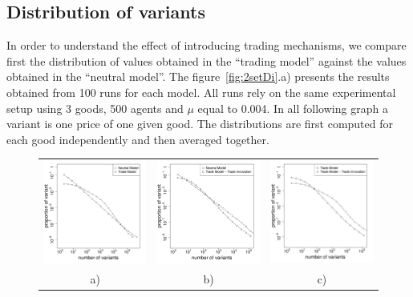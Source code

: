 \documentclass{wscpaperproc}
\begin{document}
\subsection{Distribution of variants}

In order to understand the effect of introducing trading mechanisms, we compare first the distribution of values obtained in the ``trading model'' against the values obtained in the ``neutral model''. The figure~\ref{fig:2setDi}.a) presents the results obtained from 100 runs for each model. All runs rely on the same experimental setup using 3 goods, 500 agents and $\mu$ equal to 0.004. In all following graph  a variant is one price of one given good. The distributions are first computed for each good independently and then averaged together.

\begin{figure}[!h]
	\begin{center}
		\begin{tabular}{ccc}
		\includegraphics[width=5.2cm]{img/2SetupDistribA.pdf} &
		\includegraphics[width=5.2cm]{img/2SetupDistribB.pdf} &
		\includegraphics[width=5.2cm]{img/2SetupDistribD.pdf} \\
		a) & b) & c)  \\
		\end{tabular}


\end{center}
\end{figure}
\end{document}
